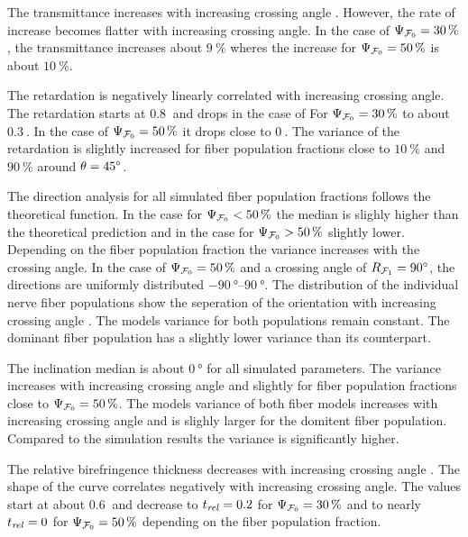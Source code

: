 % 
The transmittance increases with increasing crossing angle \modelOmega{}.
However, the rate of increase becomes flatter with increasing crossing angle.
In the case of $\textnormal{$\Psi_{\textnormal{$\mathcal{F}_0$}}$} = \SI{30}{\percent}$, the transmittance increases about $\SI{9}{\percent}$ wheres the increase for $\textnormal{$\Psi_{\textnormal{$\mathcal{F}_0$}}$} = \SI{50}{\percent}$ is about $\SI{10}{\percent}$.
\par
The retardation is negatively linearly correlated with increasing crossing angle.
The retardation starts at $\SI{0.8}{}$ and drops in the case of For $\textnormal{$\Psi_{\textnormal{$\mathcal{F}_0$}}$}=\SI{30}{\percent}$ to about $\SI{0.3}{}$.
In the case of $\textnormal{$\Psi_{\textnormal{$\mathcal{F}_0$}}$}=\SI{50}{\percent}$ it drops close to $\SI{0}{}$.
The variance of the retardation is slightly increased for fiber population fractions close to $\SI{10}{\percent}$ and $\SI{90}{\percent}$ around $\textnormal{$\theta$}=\SI{45}{\degree}$.
\par
The direction analysis for all simulated fiber population fractions \modelPsi{} follows the theoretical  function.
In the case for $\textnormal{$\Psi_{\textnormal{$\mathcal{F}_0$}}$}<\SI{50}{\percent}$ the median is slighly higher than the theoretical prediction and in the case for $\textnormal{$\Psi_{\textnormal{$\mathcal{F}_0$}}$}>\SI{50}{\percent}$ slightly lower.
Depending on the fiber population fraction the variance increases with the crossing angle.
In the case of $\textnormal{$\Psi_{\textnormal{$\mathcal{F}_0$}}$}=\SI{50}{\percent}$ and a crossing angle of $\textnormal{$R_{\textnormal{$\mathcal{F}_1$}}$} = \SI{90}{\degree}$, the directions are uniformly distributed $\SIrange{-90}{90}{\degree}$.
The distribution of the individual nerve fiber populations show the seperation of the orientation with increasing crossing angle \modelOmega{}.
The models \bvariance{} variance for both populations remain constant.
The dominant fiber population has a slightly lower variance than its counterpart.
\par
The inclination median is about $\SI{0}{\degree}$ for all simulated parameters.
The variance increases with increasing crossing angle \modelOmega{} and slightly for fiber population fractions close to $\textnormal{$\Psi_{\textnormal{$\mathcal{F}_0$}}$}=\SI{50}{\percent}$.
The models \bvariance{} variance of both fiber models increases with increasing crossing angle and is slighly larger for the domitent fiber population.
Compared to the simulation results the \bvariance{} variance is significantly higher.
\par
The relative birefringence thickness \trel{} decreases with increasing crossing angle \modelOmega{}.
The shape of the curve correlates negatively with increasing crossing angle.
The \trel{} values start at about $\SI{0.6}{}$ and decrease to $\textnormal{$t_\mathit{rel}$}=\SI{0.2}{}$ for $\textnormal{$\Psi_{\textnormal{$\mathcal{F}_0$}}$} = \SI{30}{\percent}$ and to nearly $\textnormal{$t_\mathit{rel}$}=\SI{0}{}$ for $\textnormal{$\Psi_{\textnormal{$\mathcal{F}_0$}}$} = \SI{50}{\percent}$ depending on the fiber population fraction.

